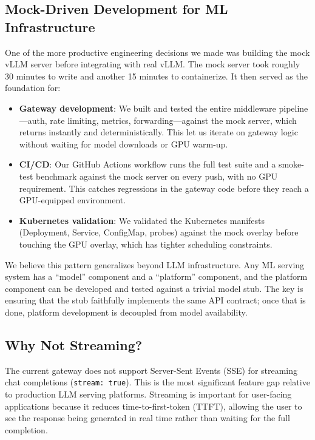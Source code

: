 \documentclass[10pt,journal]{IEEEtran}
\begin{document}
\subsection{Mock-Driven Development for ML Infrastructure}

One of the more productive engineering decisions we made was building the mock vLLM server before integrating with real vLLM. The mock server took roughly 30 minutes to write and another 15 minutes to containerize. It then served as the foundation for:

\begin{itemize}
  \item \textbf{Gateway development}: We built and tested the entire middleware pipeline---auth, rate limiting, metrics, forwarding---against the mock server, which returns instantly and deterministically. This let us iterate on gateway logic without waiting for model downloads or GPU warm-up.
  \item \textbf{CI/CD}: Our GitHub Actions workflow runs the full test suite and a smoke-test benchmark against the mock server on every push, with no GPU requirement. This catches regressions in the gateway code before they reach a GPU-equipped environment.
  \item \textbf{Kubernetes validation}: We validated the Kubernetes manifests (Deployment, Service, ConfigMap, probes) against the mock overlay before touching the GPU overlay, which has tighter scheduling constraints.
\end{itemize}

We believe this pattern generalizes beyond LLM infrastructure. Any ML serving system has a ``model'' component and a ``platform'' component, and the platform component can be developed and tested against a trivial model stub. The key is ensuring that the stub faithfully implements the same API contract; once that is done, platform development is decoupled from model availability.

\subsection{Why Not Streaming?}

The current gateway does not support Server-Sent Events (SSE) for streaming chat completions (\texttt{stream: true}). This is the most significant feature gap relative to production LLM serving platforms. Streaming is important for user-facing applications because it reduces time-to-first-token (TTFT), allowing the user to see the response being generated in real time rather than waiting for the full completion.
\end{document}

